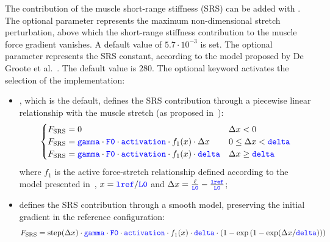 The contribution of the muscle short-range stiffness (SRS) can be added with . The optional  parameter  represents the maximum non-dimensional
stretch perturbation, above which the short-range stiffness contribution to the muscle
force gradient vanishes. A default value of $5.7\cdot10^{-3}$ is set. The optional
parameter  represents the SRS constant, according to the model proposed by
De Groote et al.~\cite{DEGROOTE-2017-SRS}. The default value is $280$.
The optional keyword  activates the selection of the implementation: 
\begin{itemize}
  \item {}, which is the default, defines the SRS contribution through a
    piecewise linear relationship with the muscle stretch 
    (as proposed in~\cite{DEGROOTE-2017-SRS}):
    \begin{equation}
      \begin{cases}
        F_{\text{SRS}} = 0 &\Delta x < 0 \\
        F_{\text{SRS}} = 
          \textcolor{blue}{\texttt{gamma}}
          \cdot 
          \textcolor{blue}{\texttt{F0}} 
          \cdot 
          \textcolor{blue}{\texttt{activation}} 
          \cdot 
          f_1(x)
          \cdot
          \Delta x
          & 0 \leq \Delta x < \textcolor{blue}{\texttt{delta}}
        \\
        F_{\text{SRS}} = 
          \textcolor{blue}{\texttt{gamma}}
          \cdot 
          \textcolor{blue}{\texttt{F0}} 
          \cdot 
          \textcolor{blue}{\texttt{activation}} 
          \cdot 
          f_1(x)
          \cdot
          \textcolor{blue}{\texttt{delta}}
          & \Delta x \ge \textcolor{blue}{\texttt{delta}}
      \end{cases}
    \end{equation}
    where $f_1$ is the active force-stretch relationship defined according to the model
    presented in~\cite{PENNESTRI-2007-JB}, $x = \textcolor{blue}{\texttt{lref}}/\textcolor{blue}{\texttt{L0}}$ and 
    $\Delta x = \frac{\ell}{\textcolor{blue}{\texttt{L0}}} - \frac{\textcolor{blue}{\texttt{lref}}}{\textcolor{blue}{\texttt{L0}}}$;
  \item {} defines the SRS contribution through a smooth model, preserving
    the initial gradient in the reference configuration:
    \begin{equation}
      F_{\text{SRS}} = 
      \text{step}(\Delta x) 
      \cdot
      \textcolor{blue}{\texttt{gamma}} 
      \cdot
      \textcolor{blue}{\texttt{F0}}
      \cdot
      \textcolor{blue}{\texttt{activation}} 
      \cdot
      f_1(x)
      \cdot
      \textcolor{blue}{\texttt{delta}}
      \cdot
      \left(
        1 - \text{exp}
        \left(
          1 - \text{exp}(\Delta x/\textcolor{blue}{\texttt{delta}})
        \right)
      \right)
    \end{equation}
\end{itemize}

